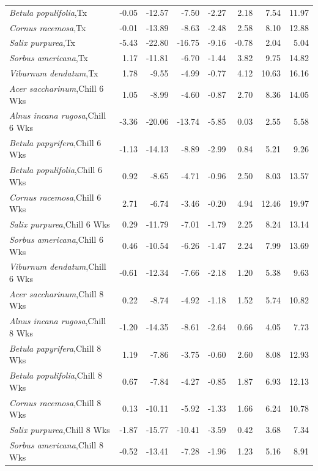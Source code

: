 \documentclass{article}\usepackage[]{graphicx}\usepackage[]{color}
\begin{document}
\begin{longtable}{lrrrrrrr}
  \textit{Betula populifolia},Tx & -0.05 & -12.57 & -7.50 & -2.27 & 2.18 & 7.54 & 11.97 \\ 
  \textit{Cornus racemosa},Tx & -0.01 & -13.89 & -8.63 & -2.48 & 2.58 & 8.10 & 12.88 \\ 
  \textit{Salix purpurea},Tx & -5.43 & -22.80 & -16.75 & -9.16 & -0.78 & 2.04 & 5.04 \\ 
  \textit{Sorbus americana},Tx & 1.17 & -11.81 & -6.70 & -1.44 & 3.82 & 9.75 & 14.82 \\ 
  \textit{Viburnum dendatum},Tx & 1.78 & -9.55 & -4.99 & -0.77 & 4.12 & 10.63 & 16.16 \\ 
  \textit{Acer saccharinum},Chill 6 Wks & 1.05 & -8.99 & -4.60 & -0.87 & 2.70 & 8.36 & 14.05 \\ 
  \textit{Alnus incana rugosa},Chill 6 Wks & -3.36 & -20.06 & -13.74 & -5.85 & 0.03 & 2.55 & 5.58 \\ 
  \textit{Betula papyrifera},Chill 6 Wks & -1.13 & -14.13 & -8.89 & -2.99 & 0.84 & 5.21 & 9.26 \\ 
  \textit{Betula populifolia},Chill 6 Wks & 0.92 & -8.65 & -4.71 & -0.96 & 2.50 & 8.03 & 13.57 \\ 
  \textit{Cornus racemosa},Chill 6 Wks & 2.71 & -6.74 & -3.46 & -0.20 & 4.94 & 12.46 & 19.97 \\ 
  \textit{Salix purpurea},Chill 6 Wks & 0.29 & -11.79 & -7.01 & -1.79 & 2.25 & 8.24 & 13.14 \\ 
  \textit{Sorbus americana},Chill 6 Wks & 0.46 & -10.54 & -6.26 & -1.47 & 2.24 & 7.99 & 13.69 \\ 
  \textit{Viburnum dendatum},Chill 6 Wks & -0.61 & -12.34 & -7.66 & -2.18 & 1.20 & 5.38 & 9.63 \\ 
  \textit{Acer saccharinum},Chill 8 Wks & 0.22 & -8.74 & -4.92 & -1.18 & 1.52 & 5.74 & 10.82 \\ 
  \textit{Alnus incana rugosa},Chill 8 Wks & -1.20 & -14.35 & -8.61 & -2.64 & 0.66 & 4.05 & 7.73 \\ 
  \textit{Betula papyrifera},Chill 8 Wks & 1.19 & -7.86 & -3.75 & -0.60 & 2.60 & 8.08 & 12.93 \\ 
  \textit{Betula populifolia},Chill 8 Wks & 0.67 & -7.84 & -4.27 & -0.85 & 1.87 & 6.93 & 12.13 \\ 
  \textit{Cornus racemosa},Chill 8 Wks & 0.13 & -10.11 & -5.92 & -1.33 & 1.66 & 6.24 & 10.78 \\ 
  \textit{Salix purpurea},Chill 8 Wks & -1.87 & -15.77 & -10.41 & -3.59 & 0.42 & 3.68 & 7.34 \\ 
  \textit{Sorbus americana},Chill 8 Wks & -0.52 & -13.41 & -7.28 & -1.96 & 1.23 & 5.16 & 8.91 \\ 

\end{longtable}
\end{document}
